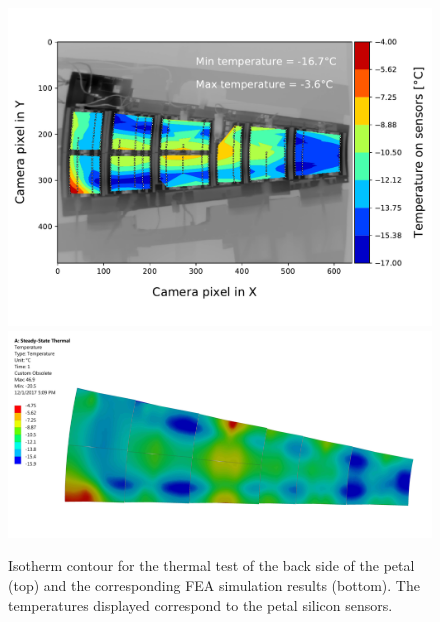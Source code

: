 		\begin{landscape}		
			\begin{figure}
				\centering
				\captionsetup{justification=centering,margin=0cm}
				\includegraphics[scale=0.65]{Figures/Chapter04/thermogram_markers_9_201711271006.pdf}
				\includegraphics[scale=0.045]{Figures/Chapter04/FEA_thermogram_markers_9_201711271006.jpg}
				\caption{Isotherm contour for the thermal test of the back side of the petal (top) and the corresponding FEA simulation results (bottom). The temperatures displayed correspond to the petal silicon sensors.}\label{fig4.9}
			\end{figure}	
		\end{landscape}	